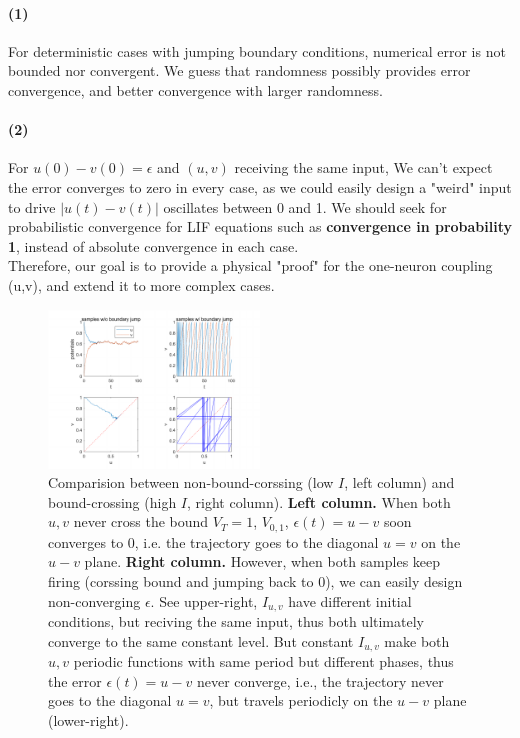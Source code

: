 \documentclass[10pt]{article}
\begin{document}
\begin{multicols}{2}
\paragraph{(1)}For deterministic cases with jumping boundary conditions, numerical error is not bounded nor convergent. We guess that randomness possibly provides error convergence, and better convergence with larger randomness.
\paragraph{(2)}For $u(0) - v(0)= \epsilon$ and $(u,v)$ receiving the same input, We can't expect the error converges to zero in every case, as we could easily design a "weird" input to drive $|u(t) - v(t)|$ oscillates between 0 and 1. We should seek for probabilistic convergence for LIF equations such as {\bf{convergence in probability 1}}, instead of absolute convergence in each case. \\
\indent
Therefore, our goal is to provide a physical "proof" for the one-neuron coupling (u,v), and extend it to more complex cases. 
\begin{figure}[H] %
\includegraphics[width=0.5\textwidth]{BG_conv&nonconv.pdf}
\caption{\color{Gray}Comparision between non-bound-corssing (low $I$, left column) and bound-crossing (high $I$, right column). {\bf Left column.} When both $u,v$ never cross the bound $V_T=1$, $V_{0,1}$, $\epsilon(t) = u-v$ soon converges to 0, i.e. the trajectory goes to the diagonal $u=v$ on the $u-v$ plane. {\bf Right column.} However, when both samples keep firing (corssing bound and jumping back to 0), we can easily design non-converging $\epsilon$. See upper-right,  $I_{u,v}$ have different initial conditions, but reciving the same input, thus both ultimately converge to the same constant level. But constant $I_{u,v}$ make both $u,v$ periodic functions with same period but different phases, thus the error $\epsilon(t) = u-v$ never converge, i.e., the trajectory never goes to the diagonal $u=v$, but travels periodicly on the $u-v$ plane (lower-right).}
\label{BG_conv&nonconv} %
\end{figure}
\indent


\end{multicols}
\end{document}
